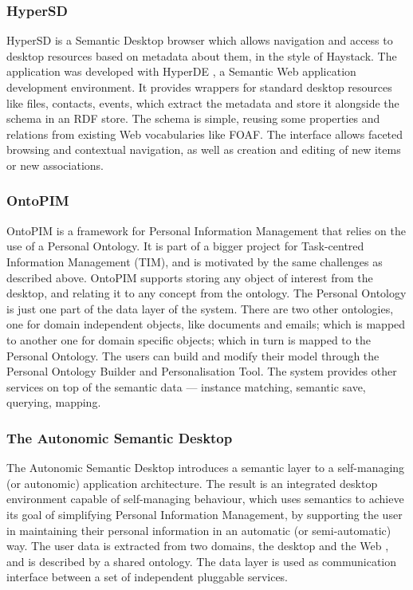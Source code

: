 \subsubsection{HyperSD}

HyperSD \cite{Schwabe2005} is a Semantic Desktop browser which allows navigation and access to desktop resources based on metadata about them, in the style of Haystack. The application was developed with HyperDE \cite{Nunes2005,Nunes2006}, a Semantic Web application development environment. It provides wrappers for standard desktop resources like files, contacts, events, which extract the metadata and store it alongside the schema in an RDF store. The schema is simple, reusing some properties and relations from existing Web vocabularies like FOAF. 
The interface allows faceted browsing and contextual navigation, as well as creation and editing of new items or new associations. 

\subsubsection{OntoPIM} 

OntoPIM \cite{Katifori2005} is a framework for Personal Information Management that relies on the use of a Personal Ontology. It is part of a bigger project for Task-centred Information Management (TIM), and is motivated by the same challenges as described above.
OntoPIM supports storing any object of interest from the desktop, and relating it to any concept from the ontology. The Personal Ontology is just one part of the data layer of the system. There are two other ontologies, one for domain independent objects, like documents and emails; which is mapped to another one for domain specific objects; which in turn is mapped to the Personal Ontology. The users can build and modify their model through the Personal Ontology Builder and Personalisation Tool. The system provides other services on top of the semantic data --- instance matching, semantic save, querying, mapping.

\subsubsection{The Autonomic Semantic Desktop}

The Autonomic Semantic Desktop \cite{Breitman2006} introduces a semantic layer to a self-managing (or autonomic) application architecture. The result is an integrated desktop environment capable of self-managing behaviour, which uses semantics to achieve its goal of simplifying Personal Information Management, by supporting the user in maintaining their personal information in an automatic (or semi-automatic) way. The user data is extracted from two domains, the desktop and the Web \cite{Breitman2005}, and is described by a shared ontology. The data layer is used as communication interface between a set of independent pluggable services.

